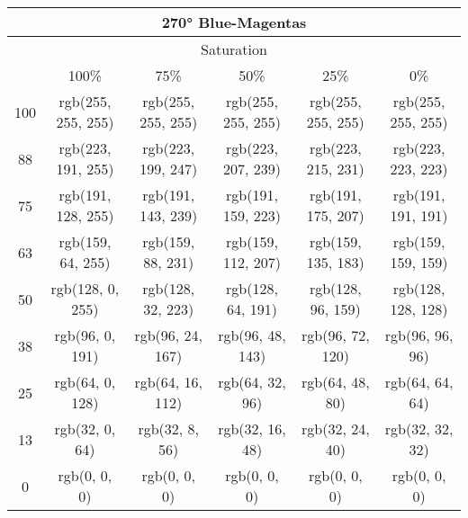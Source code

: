 \documentclass[a4j]{jarticle}
\begin{document}
\begin{tabular}{|c|c|c|c|c|c|}
\multicolumn{6}{|c|}{270°
 Blue-Magentas}\\\hline\multicolumn{6}{|c|}{Saturation}\\\hline&100\%&75\%&50\%&25\%&0\%\\\hline100&rgb(255,
     255, 255)&rgb(255, 255, 255)&rgb(255, 255, 255)&rgb(255, 255,
                 255)&rgb(255, 255, 255)\\\hline88&rgb(223, 191,
     255)&rgb(223, 199, 247)&rgb(223, 207, 239)&rgb(223, 215,
                 231)&rgb(223, 223, 223)\\\hline75&rgb(191, 128,
     255)&rgb(191, 143, 239)&rgb(191, 159, 223)&rgb(191, 175,
                 207)&rgb(191, 191, 191)\\\hline63&rgb(159, 64,
     255)&rgb(159, 88, 231)&rgb(159, 112, 207)&rgb(159, 135,
                 183)&rgb(159, 159, 159)\\\hline50&rgb(128, 0,
     255)&rgb(128, 32, 223)&rgb(128, 64, 191)&rgb(128, 96, 159)&rgb(128,
                     128, 128)\\\hline38&rgb(96, 0, 191)&rgb(96, 24,
         167)&rgb(96, 48, 143)&rgb(96, 72, 120)&rgb(96, 96,
                     96)\\\hline25&rgb(64, 0, 128)&rgb(64, 16,
         112)&rgb(64, 32, 96)&rgb(64, 48, 80)&rgb(64, 64,
                     64)\\\hline13&rgb(32, 0, 64)&rgb(32, 8, 56)&rgb(32,
             16, 48)&rgb(32, 24, 40)&rgb(32, 32, 32)\\\hline0&rgb(0, 0,
     0)&rgb(0, 0, 0)&rgb(0, 0, 0)&rgb(0, 0, 0)&rgb(0, 0, 0) 
\end{tabular}
\end{document}
